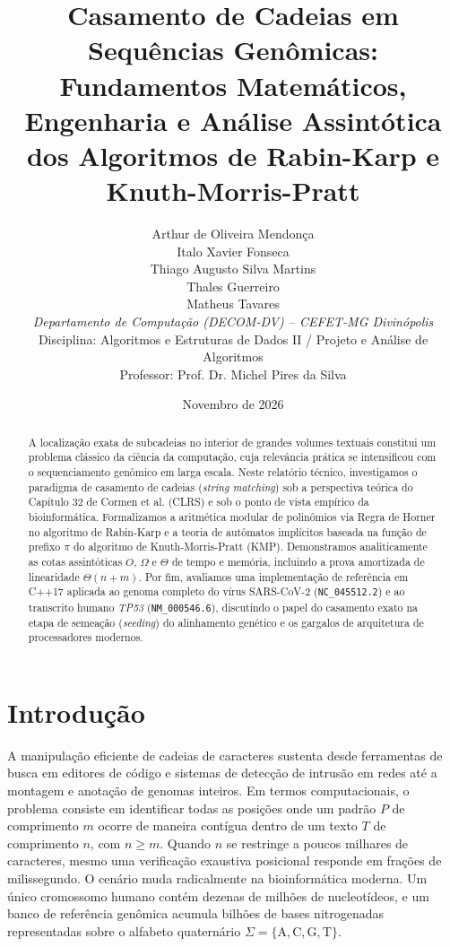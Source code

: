 \documentclass[12pt,a4paper]{article}
\title{\textbf{Casamento de Cadeias em Sequ\^encias Gen\^omicas: Fundamentos Matem\'aticos, Engenharia e An\'alise Assint\'otica dos Algoritmos de Rabin-Karp e Knuth-Morris-Pratt}}
\author{
    Arthur de Oliveira Mendon\c{c}a \\
    Italo Xavier Fonseca \\
    Thiago Augusto Silva Martins \\
    Thales Guerreiro \\
    Matheus Tavares \\[0.4cm]
    \textit{Departamento de Computa\c{c}\~ao (DECOM-DV) -- CEFET-MG Divin\'opolis} \\
    Disciplina: Algoritmos e Estruturas de Dados II / Projeto e An\'alise de Algoritmos \\
    Professor: Prof. Dr. Michel Pires da Silva
}
\date{Novembro de 2026}
\begin{document}
\maketitle

\begin{abstract}
A localiza\c{c}\~ao exata de subcadeias no interior de grandes volumes textuais constitui um problema cl\'assico da ci\^encia da computa\c{c}\~ao, cuja relev\^ancia pr\'atica se intensificou com o sequenciamento gen\^omico em larga escala. Neste relat\'orio t\'ecnico, investigamos o paradigma de casamento de cadeias (\textit{string matching}) sob a perspectiva te\'orica do Cap\'itulo 32 de Cormen et al. (CLRS) e sob o ponto de vista emp\'irico da bioinform\'atica. Formalizamos a aritm\'etica modular de polin\^omios via Regra de Horner no algoritmo de Rabin-Karp e a teoria de aut\^omatos impl\'icitos baseada na fun\c{c}\~ao de prefixo $\pi$ do algoritmo de Knuth-Morris-Pratt (KMP). Demonstramos analiticamente as cotas assint\'oticas $O$, $\Omega$ e $\Theta$ de tempo e mem\'oria, incluindo a prova amortizada de linearidade $\Theta(n+m)$. Por fim, avaliamos uma implementa\c{c}\~ao de refer\^encia em C++17 aplicada ao genoma completo do v\'irus SARS-CoV-2 (\texttt{NC\_045512.2}) e ao transcrito humano \textit{TP53} (\texttt{NM\_000546.6}), discutindo o papel do casamento exato na etapa de semea\c{c}\~ao (\textit{seeding}) do alinhamento gen\'etico e os gargalos de arquitetura de processadores modernos.
\end{abstract}

\tableofcontents
\newpage

\section{Introdu\c{c}\~ao}

A manipula\c{c}\~ao eficiente de cadeias de caracteres sustenta desde ferramentas de busca em editores de c\'odigo e sistemas de detec\c{c}\~ao de intrus\~ao em redes at\'e a montagem e anota\c{c}\~ao de genomas inteiros. Em termos computacionais, o problema consiste em identificar todas as posi\c{c}\~oes onde um padr\~ao $P$ de comprimento $m$ ocorre de maneira cont\'igua dentro de um texto $T$ de comprimento $n$, com $n \ge m$. Quando $n$ se restringe a poucos milhares de caracteres, mesmo uma verifica\c{c}\~ao exaustiva posicional responde em fra\c{c}\~oes de milissegundo. O cen\'ario muda radicalmente na bioinform\'atica moderna. Um \'unico cromossomo humano cont\'em dezenas de milh\~oes de nucleot\'ideos, e um banco de refer\^encia gen\^omica acumula bilh\~oes de bases nitrogenadas representadas sobre o alfabeto quatern\'ario $\Sigma = \{\text{A}, \text{C}, \text{G}, \text{T}\}$.
\end{document}
